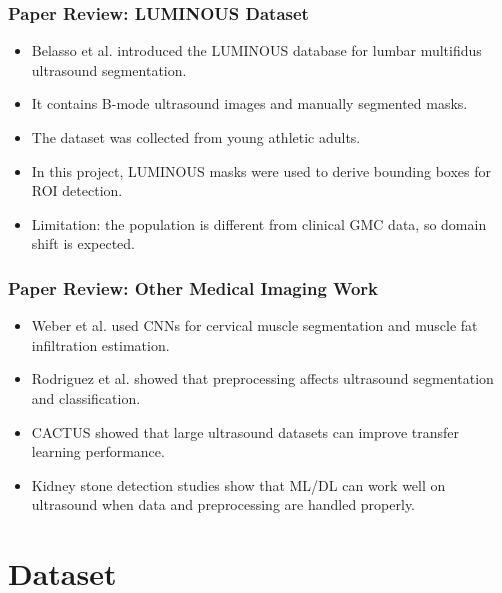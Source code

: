\documentclass{beamer}
\begin{document}
\begin{frame}
\frametitle{Paper Review: LUMINOUS Dataset}
\begin{itemize}
\item Belasso et al. introduced the LUMINOUS database for lumbar multifidus ultrasound segmentation.
\item It contains B-mode ultrasound images and manually segmented masks.
\item The dataset was collected from young athletic adults.
\item In this project, LUMINOUS masks were used to derive bounding boxes for ROI detection.
\item Limitation: the population is different from clinical GMC data, so domain shift is expected.
\end{itemize}
\end{frame}

\begin{frame}
\frametitle{Paper Review: Other Medical Imaging Work}
\begin{itemize}
\item Weber et al. used CNNs for cervical muscle segmentation and muscle fat infiltration estimation.
\item Rodriguez et al. showed that preprocessing affects ultrasound segmentation and classification.
\item CACTUS showed that large ultrasound datasets can improve transfer learning performance.
\item Kidney stone detection studies show that ML/DL can work well on ultrasound when data and preprocessing are handled properly.
\end{itemize}
\end{frame}

\section{Dataset}
\end{document}

